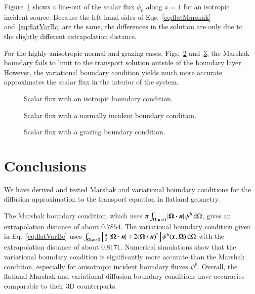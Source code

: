 \documentclass{anstrans}
\begin{document}
Figure~\ref{fig:isotropic} shows a line-out of the scalar flux $\phi_0$ along
$x=1$ for an isotropic incident source. Because the left-hand sides of
Eqs.~\eqref{eq:flatMarshak} and~\eqref{eq:flatVarBc} are the same, the
differences in the solution are only due to the slightly different
extrapolation distance.

For the highly anisotropic normal and grazing cases,
Figs.~\ref{fig:delta} and~\ref{fig:grazing}, the Marshak boundary fails to
limit to the transport solution outside of the boundary layer. However, 
the variational boundary condition yields much more accurate
approximates the scalar flux in the interior of the system.

\begin{figure}[htb!]
  \centering
  \hspace{-.5in}
  
  \hspace{-.5in}
  \caption{Scalar flux with an isotropic boundary condition.}
  \label{fig:isotropic}
\end{figure}

\begin{figure}[htb!]
  \centering
  \hspace{-.5in}
  
  \hspace{-.5in}
  \caption{Scalar flux with a normally incident boundary condition.}
  \label{fig:delta}
\end{figure}

\begin{figure}[htb!]
  \centering
  \hspace{-.5in}
  
  \hspace{-.5in}
  \caption{Scalar flux with a grazing boundary condition.}
  \label{fig:grazing}
\end{figure}

\section{Conclusions}
We have derived and tested Marshak and variational boundary
conditions for the diffusion approximation to the transport equation in
flatland geometry. 

The Marshak boundary condition, which uses $\pi \int_{\bm{\Omega}\bm{\cdot} \bm{n} <
0 } \left| \bm{\Omega}\bm{\cdot} \bm{n} \right| \psi^b \mathop{}\!\mathrm{d}\Omega$, gives an extrapolation
distance of about $0.7854$.  The variational boundary condition given in
Eq.~\eqref{eq:flatVarBc} uses $\int_{\bm{\Omega}\bm{\cdot}\bm{n} < 0} \left[
\frac{\pi}{2} \left| \bm{\Omega}\bm{\cdot}\bm{n} \right| + 2 (\bm{\Omega}\bm{\cdot}\bm{n})^2
\right] \psi^b(\bm{x}, \bm{\Omega}) \mathop{}\!\mathrm{d}\Omega$ with the extrapolation
distance of about $0.8171$. Numerical simulations show that the variational
boundary condition is significantly more accurate than the Marshak condition,
especially for anisotropic incident boundary fluxes $\psi^b$. Overall, the
flatland Marshak and variational diffusion boundary conditions have accuracies
comparable to their 3D counterparts. 
\end{document}
